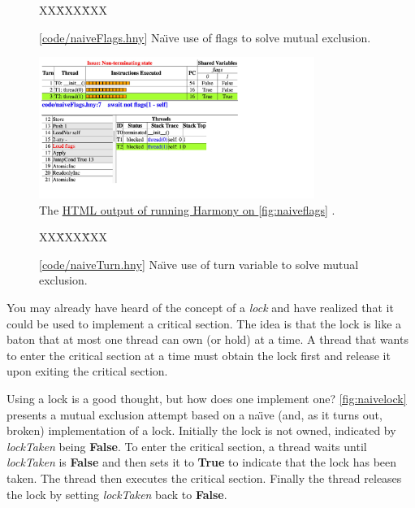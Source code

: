 \documentclass{report}
\newcommand{\harmonysource}[1]{
\begin{tabbing}
XX\=XXX\=XXX\kill
    
\end{tabbing}
}
\newcommand{\harmonylink}[1]{%
[\href{https://harmony.cs.cornell.edu/#1}{\underline{#1}}]%
}
\newcommand{\harmonyref}[2]{%
\href{https://harmony.cs.cornell.edu/output/#1}{\underline{#2}}%
}
\newenvironment{code}{
\tcolorbox
}{
\endtcolorbox
}
\begin{document}
\begin{figure}
\begin{code}
\harmonysource{naiveFlags}
\end{code}
\caption{\harmonylink{code/naiveFlags.hny} Na\"{\i}ve use of flags to solve mutual exclusion.}
\label{fig:naiveflags}
\end{figure}

\begin{figure}
\begin{center}
\includegraphics[width=0.8\textwidth]{figures/naiveFlags.pdf}
\end{center}
\caption{The \harmonyref{naiveFlags.html}{HTML output of running Harmony on \autoref{fig:naiveflags}}.}
\label{fig:naiveflagshtml}
\end{figure}

\begin{figure}
\begin{code}
\harmonysource{naiveTurn}
\end{code}
\caption{\harmonylink{code/naiveTurn.hny} Na\"{\i}ve use of turn variable to solve mutual exclusion.}
\label{fig:naiveturn}
\end{figure}

%

You may already have heard of the concept of a \emph{lock}
%
and have realized that
it could be used to implement a critical section.
The idea is that the lock is like a baton that at most one thread can own
(or hold) at a time.
A thread that wants to enter the critical section at a time must obtain the
lock first and release it upon exiting the critical section.

Using a lock is a good thought, but how does one implement one?
\autoref{fig:naivelock} presents a mutual exclusion attempt based on a
na\"{\i}ve (and, as it turns out, broken) implementation of a lock.
Initially the lock is not owned, indicated by \textit{lockTaken} being \textbf{False}.
To enter the critical section, a thread waits until \textit{lockTaken} is \textbf{False}
and then sets it to \textbf{True} to indicate that the lock has been taken.
The thread then executes the critical section.  Finally the thread
releases the lock by setting \textit{lockTaken} back to \textbf{False}.
\end{document}
